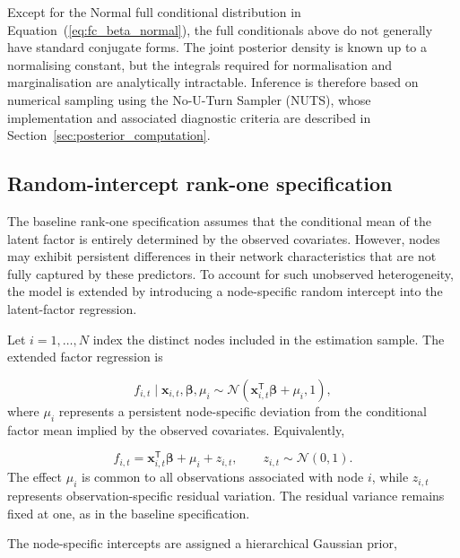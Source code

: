 \documentclass[pdftex,12pt,openright,a4paper,oneside]{book}
\begin{document}
Except for the Normal full conditional distribution in
Equation~(\ref{eq:fc_beta_normal}), the full conditionals
above do not generally have standard conjugate forms.
The joint posterior density is known up to a normalising
constant, but the integrals required for normalisation
and marginalisation are analytically intractable.
Inference is therefore based on numerical sampling
using the No-U-Turn Sampler (NUTS), whose implementation
and associated diagnostic criteria are described in
Section~\ref{sec:posterior_computation}.

\subsection{Random-intercept rank-one specification}
\label{subsec:node_specific_model}

The baseline rank-one specification assumes that the
conditional mean of the latent factor is entirely determined
by the observed covariates. However, nodes may exhibit
persistent differences in their network characteristics
that are not fully captured by these predictors.
To account for such unobserved heterogeneity, the model
is extended by introducing a node-specific random intercept
into the latent-factor regression.

Let $i=1,\ldots,N$ index the distinct nodes included
in the estimation sample. The extended factor regression is

\begin{equation}
f_{i,t}\mid
\boldsymbol{x}_{i,t},\boldsymbol{\beta},\mu_i
\sim
\mathcal{N}
\left(
\boldsymbol{x}_{i,t}^{\mathsf T}\boldsymbol{\beta}
+\mu_i,1
\right),
\label{eq:node_specific_factor}
\end{equation}
where $\mu_i$ represents a persistent node-specific
deviation from the conditional factor mean implied by the observed
covariates. Equivalently,

\begin{equation}
f_{i,t}
=
\boldsymbol{x}_{i,t}^{\mathsf T}\boldsymbol{\beta}
+\mu_i+z_{i,t},
\qquad
z_{i,t}\sim\mathcal{N}(0,1).
\label{eq:node_specific_decomposition}
\end{equation}
The effect $\mu_i$ is common to all observations
associated with node $i$, while $z_{i,t}$ represents
observation-specific residual variation.
The residual variance remains fixed at one, as in
the baseline specification.

The node-specific intercepts are assigned a hierarchical
Gaussian prior,
\end{document}
